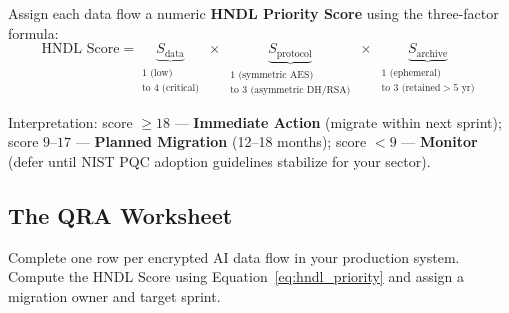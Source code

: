 Assign each data flow a numeric \textbf{HNDL Priority Score} using the three-factor formula:
\begin{equation}
\text{HNDL Score} = \underbrace{S_{\text{data}}}_{\substack{1 \text{ (low)} \\ \text{to } 4 \text{ (critical)}}}
\;\times\;
\underbrace{S_{\text{protocol}}}_{\substack{1 \text{ (symmetric AES)} \\ \text{to } 3 \text{ (asymmetric DH/RSA)}}}
\;\times\;
\underbrace{S_{\text{archive}}}_{\substack{1 \text{ (ephemeral)} \\ \text{to } 3 \text{ (retained} > 5\text{ yr)}}}
\label{eq:hndl_priority}
\end{equation}

\noindent Interpretation: score $\geq 18$ --- \textbf{Immediate Action} (migrate within next sprint); score $9$--$17$ --- \textbf{Planned Migration} (12--18 months); score $< 9$ --- \textbf{Monitor} (defer until NIST PQC adoption guidelines stabilize for your sector).

\subsection{The QRA Worksheet}
\label{sec:qra_worksheet}

Complete one row per encrypted AI data flow in your production system. Compute the HNDL Score using Equation~\eqref{eq:hndl_priority} and assign a migration owner and target sprint.

